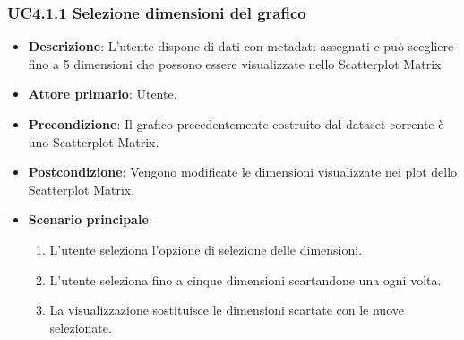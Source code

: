 \subsubsection{UC4.1.1 Selezione dimensioni del grafico}
\label{subsec:uc4.1.1}
\begin{itemize}
    \item \textbf{Descrizione}: L’utente dispone di dati con metadati assegnati e può 
                                scegliere fino a 5 dimensioni che possono essere visualizzate nello Scatterplot Matrix.
	
    \item \textbf{Attore primario}: Utente.
    
    \item \textbf{Precondizione}:   Il grafico precedentemente costruito dal dataset corrente è uno Scatterplot Matrix.
    \item \textbf{Postcondizione}:  Vengono modificate le dimensioni visualizzate nei plot dello Scatterplot Matrix.

	\item \textbf{Scenario principale}:
        \begin{enumerate}
            \item L'utente seleziona l'opzione di selezione delle dimensioni.
            \item L'utente seleziona fino a cinque dimensioni scartandone una ogni volta.
            \item La visualizzazione sostituisce le dimensioni scartate con le nuove selezionate.
        \end{enumerate}
\end{itemize}


